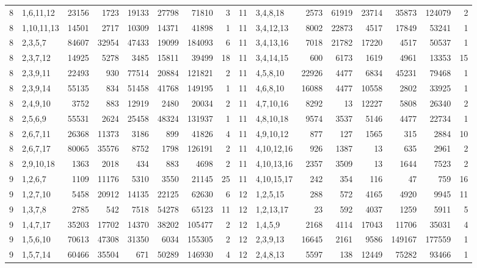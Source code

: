 \begin{table}[tp]
\begin{ruledtabular}
\begin{tabular}{rlrrrrrr@{\hspace{2.2em}}rlrrrrrr}
8 & 1,6,11,12 & 23156 & 1723 & 19133 & 27798 & 71810 & 3 & 11 & 3,4,8,18 & 2573 & 61919 & 23714 & 35873 & 124079 & 2 \\
8 & 1,10,11,13 & 14501 & 2717 & 10309 & 14371 & 41898 & 1 & 11 & 3,4,12,13 & 8002 & 22873 & 4517 & 17849 & 53241 & 1 \\
8 & 2,3,5,7 & 84607 & 32954 & 47433 & 19099 & 184093 & 6 & 11 & 3,4,13,16 & 7018 & 21782 & 17220 & 4517 & 50537 & 1 \\
8 & 2,3,7,12 & 14925 & 5278 & 3485 & 15811 & 39499 & 18 & 11 & 3,4,14,15 & 600 & 6173 & 1619 & 4961 & 13353 & 15 \\
8 & 2,3,9,11 & 22493 & 930 & 77514 & 20884 & 121821 & 2 & 11 & 4,5,8,10 & 22926 & 4477 & 6834 & 45231 & 79468 & 1 \\
8 & 2,3,9,14 & 55135 & 834 & 51458 & 41768 & 149195 & 1 & 11 & 4,6,8,10 & 16088 & 4477 & 10558 & 2802 & 33925 & 1 \\
8 & 2,4,9,10 & 3752 & 883 & 12919 & 2480 & 20034 & 2 & 11 & 4,7,10,16 & 8292 & 13 & 12227 & 5808 & 26340 & 2 \\
8 & 2,5,6,9 & 55531 & 2624 & 25458 & 48324 & 131937 & 1 & 11 & 4,8,10,18 & 9574 & 3537 & 5146 & 4477 & 22734 & 1 \\
8 & 2,6,7,11 & 26368 & 11373 & 3186 & 899 & 41826 & 4 & 11 & 4,9,10,12 & 877 & 127 & 1565 & 315 & 2884 & 10 \\
8 & 2,6,7,17 & 80065 & 35576 & 8752 & 1798 & 126191 & 2 & 11 & 4,10,12,16 & 926 & 1387 & 13 & 635 & 2961 & 2 \\
8 & 2,9,10,18 & 1363 & 2018 & 434 & 883 & 4698 & 2 & 11 & 4,10,13,16 & 2357 & 3509 & 13 & 1644 & 7523 & 2 \\
9 & 1,2,6,7 & 1109 & 11176 & 5310 & 3550 & 21145 & 25 & 11 & 4,10,15,17 & 242 & 354 & 116 & 47 & 759 & 16 \\
9 & 1,2,7,10 & 5458 & 20912 & 14135 & 22125 & 62630 & 6 & 12 & 1,2,5,15 & 288 & 572 & 4165 & 4920 & 9945 & 11 \\
9 & 1,3,7,8 & 2785 & 542 & 7518 & 54278 & 65123 & 11 & 12 & 1,2,13,17 & 23 & 592 & 4037 & 1259 & 5911 & 5 \\
9 & 1,4,7,17 & 35203 & 17702 & 14370 & 38202 & 105477 & 2 & 12 & 1,4,5,9 & 2168 & 4114 & 17043 & 11706 & 35031 & 4 \\
9 & 1,5,6,10 & 70613 & 47308 & 31350 & 6034 & 155305 & 2 & 12 & 2,3,9,13 & 16645 & 2161 & 9586 & 149167 & 177559 & 1 \\
9 & 1,5,7,14 & 60466 & 35504 & 671 & 50289 & 146930 & 4 & 12 & 2,4,8,13 & 5597 & 138 & 12449 & 75282 & 93466 & 1 \\

\end{tabular}
\end{ruledtabular}
\end{table}
